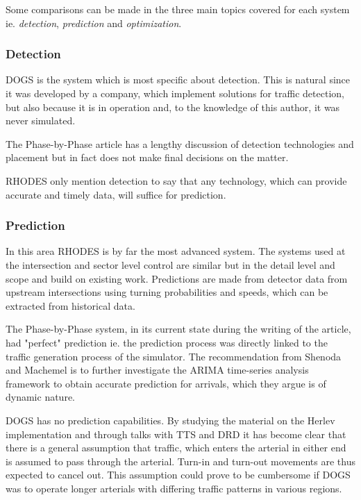 Some comparisons can be made in the three main topics covered for each
system ie. \textit{detection}, \textit{prediction} and
\textit{optimization}.

\subsubsection*{Detection}

DOGS is the system which is most specific about detection. This is
natural since it was developed by a company, which implement solutions
for traffic detection, but also because it is in operation and, to the
knowledge of this author, it was never simulated.

The Phase-by-Phase article has a lengthy discussion of detection
technologies and placement but in fact does not make final decisions
on the matter.

RHODES only mention detection to say that any technology, which can provide accurate and timely data, will suffice for prediction.

\subsubsection*{Prediction}

In this area RHODES is by far the most advanced system. The systems
used at the intersection and sector level control are similar but in
the detail level and scope and build on existing work. Predictions are
made from detector data from upstream intersections using turning
probabilities and speeds, which can be extracted from historical data.

The Phase-by-Phase system, in its current state during the writing of
the article, had "perfect" prediction ie. the prediction process was
directly linked to the traffic generation process of the
simulator. The recommendation from Shenoda and Machemel is to further
investigate the ARIMA time-series analysis framework to obtain
accurate prediction for arrivals, which they argue is of dynamic
nature.

DOGS has no prediction capabilities. By studying the material on the
Herlev implementation and through talks with TTS and DRD it has become
clear that there is a general assumption that traffic, which enters
the arterial in either end is assumed to pass through the
arterial. Turn-in and turn-out movements are thus expected to cancel
out. This assumption could prove to be cumbersome if DOGS was to
operate longer arterials with differing traffic patterns in various
regions.

